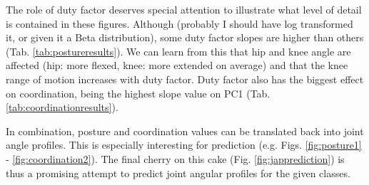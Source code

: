 The role of duty factor deserves special attention to illustrate what level of detail is contained in these figures.
Although  (probably I should have log transformed it, or given it a Beta distribution), some duty factor slopes are higher than others (Tab. \ref{tab:postureresults}).
We can learn from this that hip and knee angle are affected (hip: more flexed, knee: more extended on average) and that the knee range of motion increases with duty factor.
Duty factor also has the biggest effect on coordination, being the highest slope value on PC1 (Tab. \ref{tab:coordinationresults}).


In combination, posture and coordination values can be translated back into joint angle profiles.
This is especially interesting for prediction (e.g. Figs. \ref{fig:posture1} - \ref{fig:coordination2}).
The final cherry on this cake (Fig. \ref{fig:japprediction}) is thus a promising attempt to predict joint angular profiles for the given classes.

